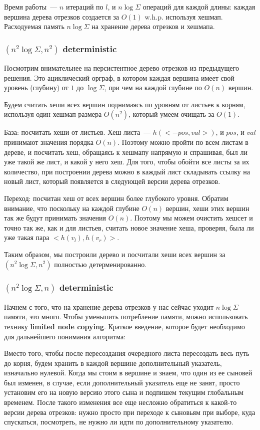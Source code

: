 {Время работы~--- $n$ итераций по $l$, и $n \log \Sigma$ операций для каждой длины: каждая вершина дерева отрезков создается за $O(1)$ w.h.p. используя хешмап. Расходуемая память $n \log \Sigma$ на хранение дерева отрезков и хешмапа.


\subsubsection{$(n^2 \log \Sigma, n^2)$ deterministic}

Посмотрим внимательнее на персистентное дерево отрезков из предыдущего решения. Это ациклический орграф, в котором каждая вершина имеет свой уровень (глубину) от $1$ до $\log \Sigma$, при чем на каждой глубине по $O(n)$ вершин.

Будем считать хеши всех вершин поднимаясь по уровням от листьев к корням, используя один хешмап размера $O(n^2)$, который умеем очищать за $O(1)$.

База: посчитать хеши от листьев. Хеш листа~--- $h(<-pos, val>)$, и $pos$, и $val$ принимают значения порядка $O(n)$. Поэтому можно пройти по всем листам в дереве, и посчитать хеш, обращаясь к хешмапу напрямую и спрашивая, был ли уже такой же лист, и какой у него хеш. Для того, чтобы обойти все листы за их количество, при построении дерева можно в каждый лист складывать ссылку на новый лист, который появляется в следующей версии дерева отрезков.

Переход: посчитан хеш от всех вершин более глубокого уровня. Обратим внимание, что поскольку на каждой глубине $O(n)$ вершин, хеши этих вершин так же будут принимать значения $O(n)$. Поэтому мы можем очистить хешсет и точно так же, как и для листьев, считать новое значение хеша, проверяя, была ли уже такая пара $<h(v_l), h(v_r)>$.

Таким образом, мы построили дерево и посчитали хеши всех вершин за $(n^2 \log \Sigma, n^2)$ полностью детерменированно.


\subsubsection{$(n^2 \log \Sigma, n)$ deterministic}

Начнем с того, что на хранение дерева отрезков у нас сейчас уходит $n \log \Sigma$ памяти, это много. Чтобы уменьшить потребление памяти, можно использовать технику \textbf{limited node copying}. Краткое введение, которое будет необходимо для дальнейшего понимания алгоритма:

Вместо того, чтобы после пересоздания очередного листа пересоздать весь путь до корня, будем хранить в каждой вершине дополнительный указатель, изначально нулевой. Когда мы стоим в вершине и знаем, что один из ее сыновей был изменен, в случае, если дополнительный указатель еще не занят, просто установим его на новую версию этого сына и подпишем текущим глобальным временем. После такого изменения все еще несложно обратиться к какой-то версии дерева отрезков: нужно просто при переходе к сыновьям при выборе, куда спускаться, посмотреть, не нужно ли идти по дополнительному указателю.

}
